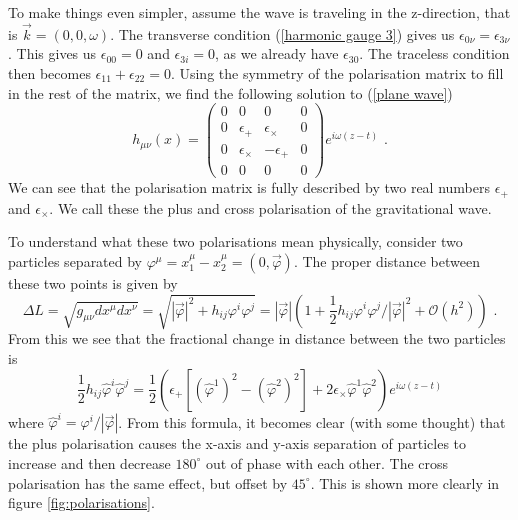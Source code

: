 \documentclass[11pt]{cuthesis}
\newcommand{\mn}{_{\mu\nu}}
\newcommand{\fs}{\text{ .}}
\begin{document}
To make things even simpler, assume the wave is traveling in the z-direction, that is $\vec{k} = (0,0,\omega)$. The transverse condition (\ref{harmonic gauge 3}) gives us $\epsilon_{0\nu} = \epsilon_{3\nu}$. This gives us $\epsilon_{0 0}= 0$ and $\epsilon_{3 i} = 0$, as we already have $\epsilon_{3 0}$. The traceless condition then becomes $\epsilon_{1 1} + \epsilon_{2 2} = 0$. Using the symmetry of the polarisation matrix to fill in the rest of the matrix, we find the following solution to (\ref{plane wave})
\begin{equation}\label{gw solution}
h\mn (x)
=
\begin{pmatrix} 
0 & 0 & 0 & 0 \\
0 & \epsilon_+ & \epsilon_\times & 0 \\
0 & \epsilon_\times & -\epsilon_+ & 0 \\
0 & 0 & 0 & 0 
\end{pmatrix}
e^{i\omega (z-t)} \fs
\end{equation}
We can see that the polarisation matrix is fully described by two real numbers $\epsilon_+$ and $\epsilon_\times$. We call these the plus and cross polarisation of the gravitational wave.

To understand what these two polarisations mean physically, consider two particles separated by $\varphi^\mu = x_1^\mu - x_2^\mu = (0,\vec{\varphi})$. The proper distance between these two points is given by
\begin{equation} \label{deltaL}
\Delta L = \sqrt{g\mn dx^\mu dx^\nu} = \sqrt{|\vec{\varphi}|^2 + h_{ij}\varphi^i \varphi^j} = | \vec{\varphi} | (1 + \frac{1}{2}h_{ij}\varphi^i \varphi^j / |\vec{\varphi}|^2 + \mathcal{O}(h^2) ) \fs
\end{equation} 
From this we see that the fractional change in distance between the two particles is
\begin{equation}
\frac{1}{2}h_{ij}\hat{\varphi}^i \hat{\varphi}^j = \frac{1}{2}\left( \epsilon_+ \left[ (\hat{\varphi}^1)^2 - (\hat{\varphi}^2)^2 \right] +2\epsilon_\times \hat{\varphi}^1\hat{\varphi}^2 \right) e^{i\omega (z-t)}
\end{equation}
where $\hat{\varphi}^i = \varphi^i/|\vec{\varphi}|$. From this formula, it becomes clear (with some thought) that the plus polarisation causes the x-axis and y-axis separation of particles to increase and then decrease $180^\circ$ out of phase with each other. The cross polarisation has the same effect, but offset by $45^\circ$. This is shown more clearly in figure \ref{fig:polarisations}. 
\end{document}

